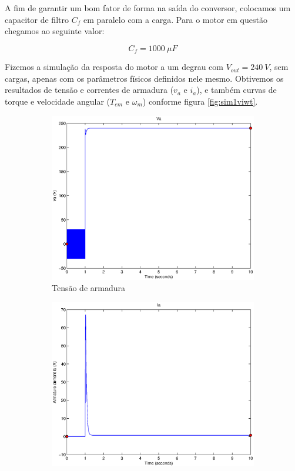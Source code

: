\documentclass{article}
\begin{document}
A fim de garantir um bom fator de forma na saída do conversor, colocamos um capacitor de filtro $C_f$ em paralelo com a carga. Para o motor em questão chegamos ao seguinte valor:

\begin{equation}
C_f=1000\ \mu F
\end{equation}

Fizemos a simulação da resposta do motor a um degrau com $V_{out}=240\ V$, sem cargas, apenas com os parâmetros físicos definidos nele mesmo.
Obtivemos os resultados de tensão e correntes de armadura ($v_a$ e $i_a$), e também curvas de torque e velocidade angular ($T_{em}$ e $\omega_m$) conforme figura \ref{fig:sim1viwt}.


\begin{figure}[h]
	\centering
	\begin{subfigure}{0.45\textwidth}
		\includegraphics[width=\linewidth]{matlab/va1}
		\caption{Tensão de armadura}
	\end{subfigure}
	\begin{subfigure}{0.45\textwidth}
		\includegraphics[width=\linewidth]{matlab/ia1}

\end{subfigure}
\end{figure}
\end{document}
